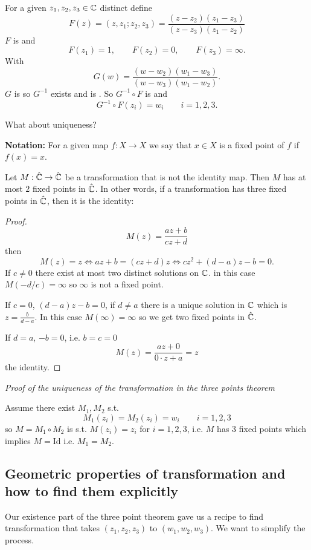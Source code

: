 \documentclass[10pt, a4paper]{article}
\begin{document}
For a given $z_1, z_2, z_3 \in \mathbb{C}$ distinct define
\[
F(z) = (z, z_1; z_2, z_3) = \frac{(z - z_2)(z_1 - z_3)}{(z - z_3)(z_1 - z_2)}
\]
$F$ is \mobius and
\[
F(z_1) = 1,\qquad F(z_2) = 0,\qquad F(z_3) = \infty.
\]
With
\[
G(w) = \frac{(w - w_2)(w_1 - w_3)}{(w - w_3)(w_1 - w_2)}.
\]
$G$ is \mobius so $G ^ {-1}$ exists and is \mobius.
So $G ^ {-1} \circ F$ is \mobius and
\[
G ^ {-1} \circ F(z_i) = w_i\qquad i = 1, 2, 3.
\]

What about uniqueness?

\textbf{Notation:}
For a given map $f : X \to X$ we say that $x \in X$ is a fixed point of $f$ if $f(x) = x$.

\begin{lemma}
    Let $M : \hat{\mathbb{C}} \to \hat{\mathbb{C}}$ be a \mobius transformation that is not the identity map.
    Then $M$ has at most $2$ fixed points in $\hat{\mathbb{C}}$.
    In other words,
    if a \mobius transformation has three fixed points in $\hat{\mathbb{C}}$,
    then it is the identity:

    \begin{proof}
        \[
        M(z) = \frac{az + b}{cz + d}
        \]
        then
        \[
        M(z) = z \iff az + b = (cz + d)z \iff cz ^ 2 + (d - a)z - b = 0.
        \]
        If $c \neq 0$ there exist at most two distinct solutions on $\mathbb{C}$.
        in this case $M(-d / c) = \infty$ so $\infty$ is not a fixed point.

        If $c = 0$,
        $(d - a)z - b = 0$,
        if $d \neq a$ there is a unique solution in $\mathbb{C}$ which is $z = \frac{b}{d - a}$.
        In this case $M(\infty) = \infty$ so we get two fixed points in $\hat{\mathbb{C}}$.

        If $d = a$,
        $-b = 0$,
        i.e. $b = c = 0$
        \[
        M(z) = \frac{az + 0}{0\cdot z + a} = z
        \]
        the identity.
    \end{proof}
\end{lemma}

\textit{Proof of the uniqueness of the \mobius transformation in the three points theorem}

Assume there exist $M_1, M_2$ \mobius s.t.
\[
M_1(z_i) = M_2(z_i) = w_i\qquad i = 1, 2, 3
\]
so $M = M_1 \circ M_2$ is \mobius s.t. $M(z_i) = z_i$ for $i = 1, 2, 3$,
i.e. $M$ has $3$ fixed points which implies $M = \mathrm{Id}$ i.e. $M_1 = M_2$.

\subsection{Geometric properties of \mobius transformation and how to find them explicitly}
Our existence part of the three point theorem gave us a recipe to find \mobius transformation that takes $(z_1, z_2, z_3)$ to $(w_1, w_2, w_3)$.
We want to simplify the process.
\end{document}
